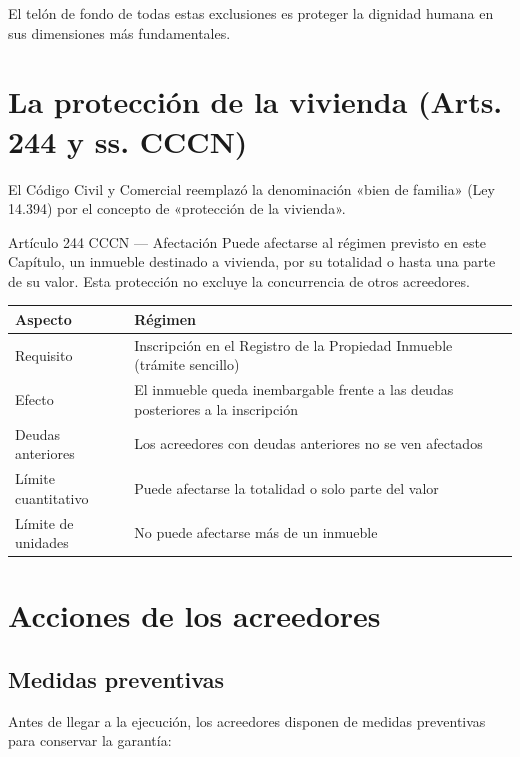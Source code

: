 \documentclass[12pt,oneside]{book}
\newenvironment{tabla}{%
    \par\medskip\begingroup\small\renewcommand{\arraystretch}{1.3}\noindent\ignorespaces
}{%
    \par\endgroup\medskip
}
\begin{document}
\begin{important}
El telón de fondo de todas estas exclusiones es proteger la dignidad humana en sus dimensiones más fundamentales.
\end{important}

\section{La protección de la vivienda (Arts. 244 y ss. CCCN)}

El Código Civil y Comercial reemplazó la denominación «bien de familia» (Ley 14.394) por el concepto de «protección de la vivienda».

\begin{norma}{Artículo 244 CCCN --- Afectación}
Puede afectarse al régimen previsto en este Capítulo, un inmueble destinado a vivienda, por su totalidad o hasta una parte de su valor. Esta protección no excluye la concurrencia de otros acreedores.
\end{norma}

\begin{tabla}
\begin{tabularx}{\textwidth}{B{3.4cm}Y}
\toprule
Aspecto & \textbf{Régimen} \\
\midrule
Requisito & Inscripción en el Registro de la Propiedad Inmueble (trámite sencillo) \\
Efecto & El inmueble queda inembargable frente a las deudas posteriores a la inscripción \\
Deudas anteriores & Los acreedores con deudas anteriores no se ven afectados \\
Límite cuantitativo & Puede afectarse la totalidad o solo parte del valor \\
Límite de unidades & No puede afectarse más de un inmueble \\
\bottomrule
\end{tabularx}
\end{tabla}

\section{Acciones de los acreedores}

\subsection{Medidas preventivas}

Antes de llegar a la ejecución, los acreedores disponen de medidas preventivas para conservar la garantía:
\end{document}
